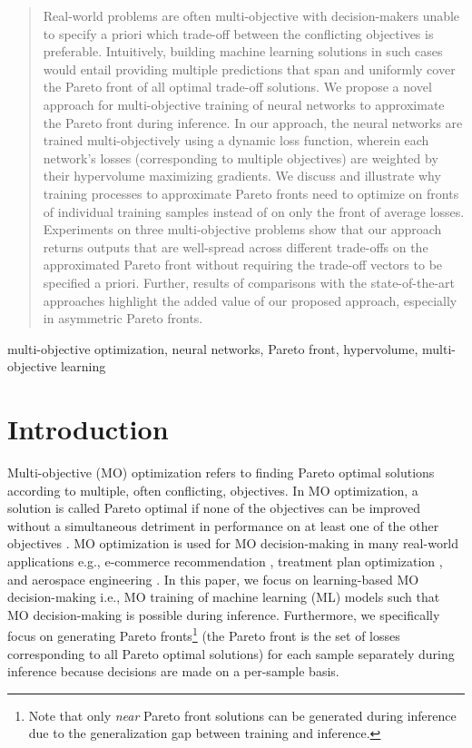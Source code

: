 \begin{abstract}%
Real-world problems are often multi-objective with decision-makers unable to specify a priori which trade-off between the conflicting objectives is preferable. Intuitively, building machine learning solutions in such cases would entail providing multiple predictions that span and uniformly cover the Pareto front of all optimal trade-off solutions. We propose a novel approach for multi-objective training of neural networks to approximate the Pareto front during inference. In our approach, the neural networks are trained multi-objectively using a dynamic loss function, wherein each network's losses (corresponding to multiple objectives) are weighted by their hypervolume maximizing gradients. We discuss and illustrate why training processes to approximate Pareto fronts need to optimize on fronts of individual training samples instead of on only the front of average losses. Experiments on three multi-objective problems show that our approach returns outputs that are well-spread across different trade-offs on the approximated Pareto front without requiring the trade-off vectors to be specified a priori. Further, results of comparisons with the state-of-the-art approaches highlight the added value of our proposed approach, especially in asymmetric Pareto fronts.
\end{abstract}

\begin{keywords}
  multi-objective optimization, neural networks, Pareto front, hypervolume, multi-objective learning
\end{keywords}

\section{Introduction}
\label{sec:introduction}
Multi-objective (MO) optimization refers to finding Pareto optimal solutions according to multiple, often conflicting, objectives. In MO optimization, a solution is called Pareto optimal if none of the objectives can be improved without a simultaneous detriment in performance on at least one of the other objectives \citep{van2000multiobjective}. MO optimization is used for MO decision-making in many real-world applications \citep{stewart2008real} e.g., e-commerce recommendation \citep{lin2019pareto}, treatment plan optimization \citep{maree2019evaluation, Mller2017MulticriteriaPO}, and aerospace engineering \citep{oyama2002multiobjective}. In this paper, we focus on learning-based MO decision-making i.e., MO training of machine learning (ML) models such that MO decision-making is possible during inference. Furthermore, we specifically focus on generating Pareto fronts\footnote{Note that only \emph{near} Pareto front solutions can be generated during inference due to the generalization gap between training and inference.} (the Pareto front is the set of losses corresponding to all Pareto optimal solutions) for each sample separately during inference because decisions are made on a per-sample basis.

